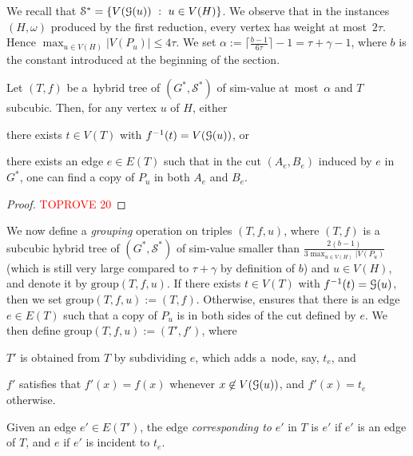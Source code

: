 \documentclass[a4paper,UKenglish,cleveref,hyperref,autoref]{lipics-v2021}
\renewcommand{\leq}{\leqslant}
\newcommand{\weight}{\omega}
\newcommand{\htree}{hybrid tree\xspace}
\begin{document}
We recall that $\mathcal S^* = \{V(\mathcal G(u))~:~u \in V(H)\}$.
We observe that in the instances $(H,\weight)$ produced by the first reduction, every vertex has weight at most~$2 \tau$.
Hence $\max_{u \in V(H)} |V(P_u)| \leq 4 \tau$.
We set $\alpha := \lceil \frac{b-1}{6 \tau} \rceil - 1 = \tau + \gamma - 1$, where $b$ is the constant introduced at the beginning of the section.

\begin{lemma}\label{lem:default-edge}
Let $(T, f)$ be a~\htree of $(G^*, \mathcal S^*)$ of sim-value at~most~$\alpha$ and $T$ subcubic.
Then, for any vertex $u$ of $H$, either
\begin{compactitem}
\item there exists $t \in V(T)$ with $f^{-1}(t) = V(\mathcal G(u))$, or
\item there exists an edge $e \in E(T)$ such that in the cut $(A_e, B_e)$ induced by $e$ in $G^*$, one can find a copy of $P_u$ in both $A_e$ and $B_e$.
\end{compactitem}
\end{lemma}

\begin{proof}\textcolor{red}{TOPROVE 20}\end{proof}

\newcommand{\group}{\text{group}}

We now define a \emph{grouping} operation on triples $(T, f, u)$, where $(T, f)$ is a subcubic \htree of $(G^*, \mathcal S^*)$ of sim-value smaller than $\frac{2(b-1)}{3\max_{u \in V(H)}|V(P_u)}$ (which is still very large compared to $\tau + \gamma$ by definition of $b$) and $u \in V(H)$, and denote it by $\group(T, f, u)$.
If there exists $t \in V(T)$ with $f^{-1}(t) = \mathcal G(u)$, then we set $\group(T, f, u) := (T, f)$.
Otherwise,  ensures that there is an edge $e \in E(T)$ such that a copy of $P_u$ is in both sides of the cut defined by $e$.
We then define $\group(T, f, u) := (T', f')$, where
\begin{compactitem}
  \item $T'$ is obtained from $T$ by subdividing $e$, which adds a~node, say, $t_e$, and
  \item $f'$ satisfies that $f'(x) = f(x)$ whenever $x \not \in V(\mathcal G(u))$, and $f'(x) = t_e$ otherwise.
\end{compactitem}
Given an edge $e' \in E(T')$, the edge \emph{corresponding to} $e'$ in $T$ is $e'$ if $e'$ is an edge of $T$, and $e$ if $e'$ is incident to $t_e$.
\end{document}
